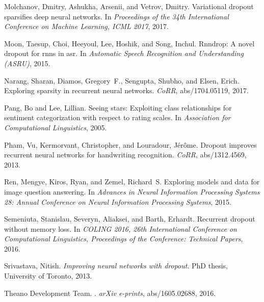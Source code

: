 \documentclass{article}
\begin{document}
\begin{thebibliography}{30}
Molchanov, Dmitry, Ashukha, Arsenii, and Vetrov, Dmitry.
\newblock Variational dropout sparsifies deep neural networks.
\newblock In \emph{Proceedings of the 34th International Conference on Machine
  Learning, ICML 2017}, 2017.

Moon, Taesup, Choi, Heeyoul, Lee, Hoshik, and Song, Inchul.
\newblock Rnndrop: A novel dropout for rnns in asr.
\newblock In \emph{Automatic Speech Recognition and Understanding (ASRU)},
  2015.

Narang, Sharan, Diamos, Gregory~F., Sengupta, Shubho, and Elsen, Erich.
\newblock Exploring sparsity in recurrent neural networks.
\newblock \emph{CoRR}, abs/1704.05119, 2017.

Pang, Bo and Lee, Lillian.
\newblock Seeing stars: Exploiting class relationships for sentiment
  categorization with respect to rating scales.
\newblock In \emph{Association for Computational Linguistics}, 2005.

Pham, Vu, Kermorvant, Christopher, and Louradour, Jérôme.
\newblock Dropout improves recurrent neural networks for handwriting
  recognition.
\newblock \emph{CoRR}, abs/1312.4569, 2013.

Ren, Mengye, Kiros, Ryan, and Zemel, Richard~S.
\newblock Exploring models and data for image question answering.
\newblock In \emph{Advances in Neural Information Processing Systems 28: Annual
  Conference on Neural Information Processing Systems}, 2015.

Semeniuta, Stanislau, Severyn, Aliaksei, and Barth, Erhardt.
\newblock Recurrent dropout without memory loss.
\newblock In \emph{{COLING} 2016, 26th International Conference on
  Computational Linguistics, Proceedings of the Conference: Technical Papers},
  2016.

Srivastava, Nitish.
\newblock \emph{Improving neural networks with dropout}.
\newblock PhD thesis, University of Toronto, 2013.

{Theano Development Team}.
.
\newblock \emph{arXiv e-prints}, abs/1605.02688, 2016.


\end{thebibliography}
\end{document}
